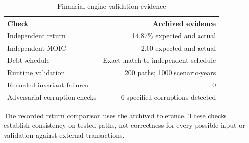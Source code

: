 \begin{table}[htbp]\centering\small
\caption{Financial-engine validation evidence}\label{tab:T2}
\begin{tabular}{lr}
\toprule
Check & Archived evidence \\
\midrule
Independent return & 14.87\% expected and actual \\
Independent MOIC & 2.00 expected and actual \\
Debt schedule & Exact match to independent schedule \\
Runtime validation & 200 paths; 1000 scenario-years \\
Recorded invariant failures & 0 \\
Adversarial corruption checks & 6 specified corruptions detected \\
\bottomrule
\end{tabular}
\par\smallskip
\begin{minipage}{\linewidth}\footnotesize The recorded return comparison uses the archived tolerance. These checks establish consistency on tested paths, not correctness for every possible input or validation against external transactions.\end{minipage}
\end{table}
